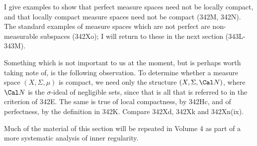 {I give examples to show that perfect measure spaces need not be locally
compact, and that locally compact measure spaces need not be compact
(342M, 342N).   The standard examples of measure spaces which are not
perfect are non-measurable subspaces (342Xo);  I will return to these in
the next section (343L-343M).

Something which is not important to us at the moment, but is perhaps
worth taking note of, is the following observation.   To determine
whether a
measure space $(X,\Sigma,\mu)$ is compact, we need only the structure
$(X,\Sigma,\Cal N)$, where $\Cal N$ is the $\sigma$-ideal of
negligible sets, since that is all that is referred to in the criterion
of 342E.   The same is true of local compactness, by 342Hc, and of
perfectness,
by the definition in 342K.   Compare 342Xd, 342Xk and 342Xn(ix).

Much of the material of this section will be repeated in Volume 4 as
part of a more systematic analysis of inner regularity.
}%

\discrpage

